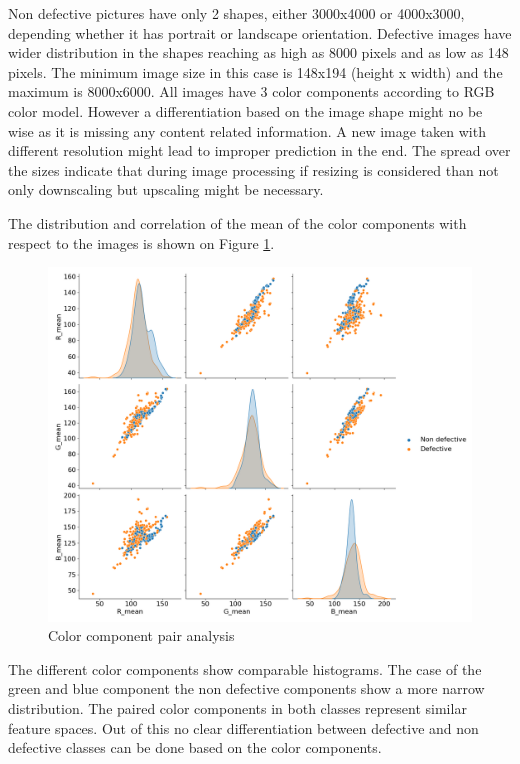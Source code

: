\documentclass[10pt, final]{article}
\begin{document}
Non defective pictures have only 2 shapes, either 3000x4000 or 4000x3000, depending whether it has
portrait or landscape orientation.
Defective images have wider distribution in the shapes reaching as high as 8000 pixels and as low as 148 pixels.
The minimum image size in this case is 148x194 (height x width) and the maximum is 8000x6000.
All images have 3 color components according to RGB color model.
However a differentiation based on the image shape might no be wise as it is missing any content related information.
A new image taken with different resolution might lead to improper prediction in the end.
The spread over the sizes indicate that during image processing if resizing is considered than not only
downscaling but upscaling might be necessary.

The distribution and correlation of the mean of the color components with respect to the images is shown on
Figure \ref{fig:comp_pair}.
\begin{figure}[!ht]
	\centering
	\includegraphics[width=\textwidth]{./tex_graphs/comp_pair.png}
	\caption{Color component pair analysis}
	\label{fig:comp_pair}
\end{figure}

The different color components show comparable histograms.
The case of the green and blue component the non defective components show a more narrow distribution.
The paired color components in both classes represent similar feature spaces.
Out of this no clear differentiation between defective and non defective classes can be done based on the color components.
\end{document}
